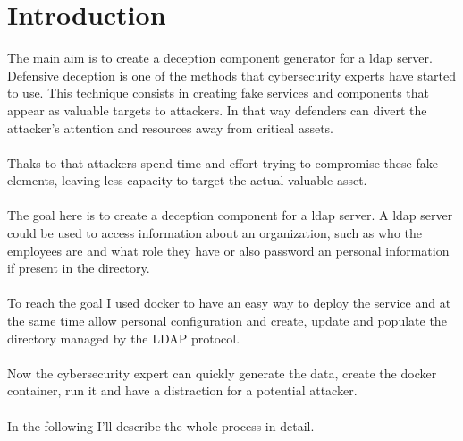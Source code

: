 \chapter*{Introduction}
The main aim is to create a deception component generator for a ldap server. Defensive deception is one of the methods that cybersecurity experts have started to use. This technique consists in creating fake services and components that appear as valuable targets to attackers.
In that way defenders can divert the attacker’s attention and resources away from critical assets. 
\\\\
Thaks to that attackers spend time and effort trying to compromise these fake elements, leaving less capacity to target the actual valuable asset. 
\\\\
The goal here is to create a deception component for a ldap server. A ldap server could be used to access information about an organization, such as who the employees are and what role they have or also password an personal information if present in the directory. 
\\\\
To reach the goal I used docker to have an easy way to deploy the service and at the same time allow personal configuration and create, update and populate the directory managed by the LDAP protocol. 
\\\\
Now the cybersecurity expert can quickly generate the data, create the docker container, run it and have a distraction for a potential attacker. 
\\\\
In the following I'll describe the whole process in detail.


